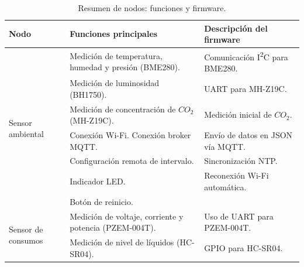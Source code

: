 \begin{table}[H]
    \centering
    \caption[Resumen de nodos]{Resumen de nodos: funciones y firmware.}
    \begin{tabular}{p{1.5cm}p{5.4cm}p{5.5cm}}
        \toprule
        \textbf{Nodo}                                     & \textbf{Funciones principales}                                                 & \textbf{Descripción del firmware}               \\
        \midrule
        \multirow{7}{1.5cm}{Sensor ambiental}             & Medición de temperatura, humedad y presión (BME280).                           & Comunicación I\textsuperscript{2}C para BME280. \\
                                                          & Medición de luminosidad (BH1750).                                              & UART para MH-Z19C.                              \\
                                                          & Medición de concentración de $CO_2$ (MH-Z19C).                                 & Medición inicial de $CO_2$.                     \\
                                                          & Conexión Wi-Fi.                     Conexión broker MQTT.                      & Envío de datos en JSON vía MQTT.                \\
                                                          & Configuración remota de intervalo.                                             & Sincronización NTP.                             \\
                                                          & Indicador LED.                                                                 & Reconexión Wi-Fi automática.                    \\
                                                          & Botón de reinicio.                                                             &                                                 \\
        \midrule
        \multirow{6}{1.5cm}{Sensor de consumos}           & Medición de voltaje, corriente y potencia (PZEM-004T).                         & Uso de UART para PZEM-004T.                     \\
                                                          & Medición de nivel de líquidos (HC-SR04).                                       & GPIO para HC-SR04.                              \\

\end{tabular}
\end{table}
